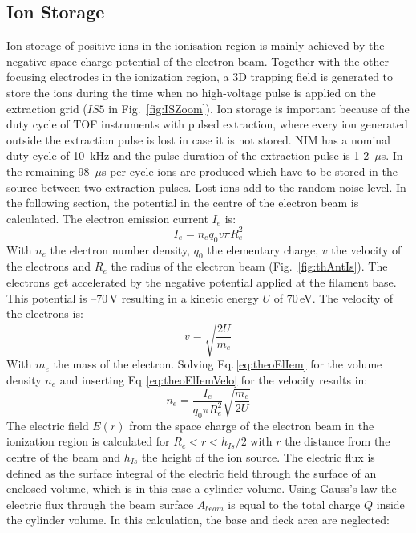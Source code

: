 		
	\subsection{Ion Storage }\label{chap:IonStor}
	Ion storage of positive ions in the ionisation region is mainly achieved by the negative space charge potential of the electron beam. Together with the other focusing electrodes in the ionization region, a 3D trapping field is generated to store the ions during the time when no high-voltage pulse is applied on the extraction grid ($IS5$ in Fig.~\ref{fig:ISZoom}). Ion storage is important because of the duty cycle of TOF instruments with pulsed extraction, where every ion generated outside the extraction pulse is lost in case it is not stored. NIM has a nominal duty cycle of 10~kHz and the pulse duration of the extraction pulse is 1-2~$\mu$s. In the remaining 98~$\mu$s per cycle ions are produced which have to be stored in the source between two extraction pulses. Lost ions add to the random noise level. In the following section, the potential in the centre of the electron beam is calculated. The electron emission current $I_{e}$ is:
	\begin{equation}
		I_{e} = n_e q_0 v\pi R_e^2
		\label{eq:theoElIem}
	\end{equation}
	With $n_e$ the electron number density, $q_0$ the elementary charge, $v$ the velocity of the electrons and $R_e$ the radius of the electron beam (Fig.~\ref{fig:thAntIs}). The electrons get accelerated by the negative potential applied at the filament base. This potential is --70\,\si{\volt} resulting in a kinetic energy $U$ of 70\,\si{\electronvolt}. The velocity of the electrons is:
	\begin{equation}
		v = \sqrt{\frac{2 U}{m_e}}
		\label{eq:theoElIemVelo}
	\end{equation}
	With $m_e$ the mass of the electron. Solving Eq.\,\eqref{eq:theoElIem} for the volume density $n_e$ and inserting Eq.\,\eqref{eq:theoElIemVelo} for the velocity results in:
	\begin{equation}
		n_e = \frac{I_e}{q_0 \pi R_e^2}\sqrt{\frac{m_e}{2U}}
		\label{eq:theoElIemNe}
	\end{equation}
	The electric field $E(r)$ from the space charge of the electron beam in the ionization region is calculated for $R_e<r<h_{Is}/2$ with $r$ the distance from the centre of the beam and $h_{Is}$ the height of the ion source. The electric flux is defined as the surface integral of the electric field through the surface of an enclosed volume, which is in this case a cylinder volume. Using Gauss's law the electric flux through the beam surface $A_{beam}$ is equal to the total charge $Q$ inside the cylinder volume. In this calculation, the base and deck area are neglected:
